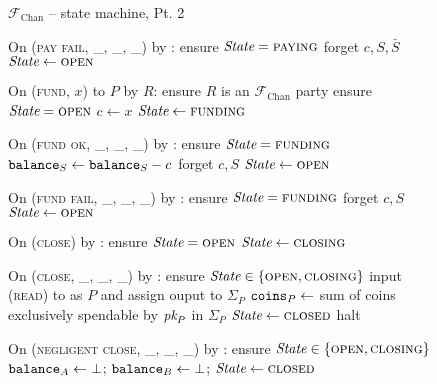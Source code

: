 \begin{figure}[H]
  \begin{systembox}{$\mathcal{F}_{\mathrm{Chan}}$ -- state machine, Pt. 2}
    \begin{algorithmic}[1]
      \State On (\textsc{pay fail}, \_, \_, \_) by \adversary:
      \Indent
        \State ensure $\itistate = \textsc{paying}$
        \State forget $c, S, \bar{S}$
        \State $\itistate \gets \textsc{open}$
      \EndIndent
      \Statex

      \State On (\textsc{fund}, $x$) to $P$ by $R$:
      \Indent
        \State ensure $R$ is an $\mathcal{F}_{\mathrm{Chan}}$ party
        \State ensure $\itistate = \textsc{open}$
        \State $c \gets x$
        \State $\itistate \gets \textsc{funding}$
      \EndIndent
      \Statex

      \State On (\textsc{fund ok}, \_, \_, \_) by \adversary:
      \Indent
        \State ensure $\itistate = \textsc{funding}$
        \State $\texttt{balance}_{S} \gets \texttt{balance}_{S} - c$
        \State forget $c, S$
        \State $\itistate \gets \textsc{open}$
      \EndIndent
      \Statex

      \State On (\textsc{fund fail}, \_, \_, \_) by \adversary:
      \Indent
        \State ensure $\itistate = \textsc{funding}$
        \State forget $c, S$
        \State $\itistate \gets \textsc{open}$
      \EndIndent
      \Statex

      \State On (\textsc{close}) by \environment:
      \Indent
        \State ensure $\itistate = \textsc{open}$
        \State $\itistate \gets \textsc{closing}$
      \EndIndent
      \Statex

      \State On (\textsc{close}, \_, \_, \_) by \adversary:
      \Indent
        \State ensure $\itistate \in \{\textsc{open}, \textsc{closing}\}$
            \State input (\textsc{read}) to \ledger as $P$ and assign ouput to
            $\Sigma_P$
            \State $\texttt{coins}_{P} \gets$ sum of coins exclusively spendable by
            $\textit{pk}_{P}$ in $\Sigma_P$
          \EndIf
        \EndFor
          \State $\itistate \gets \textsc{closed}$
        \Else \: 
          \State halt
        \EndIf
      \EndIndent
      \Statex

      \State On (\textsc{negligent close}, \_, \_, \_) by \adversary:
      \Indent
        \State ensure $\itistate \in \{\textsc{open}, \textsc{closing}\}$
        \State $\texttt{balance}_{A} \gets \bot$; $\texttt{balance}_{B} \gets \bot$;
        \State $\itistate \gets \textsc{closed}$
      \EndIndent
    \end{algorithmic}
  \end{systembox}
  \caption{}
  \label{code:functionality:state-machine-2}
\end{figure}
